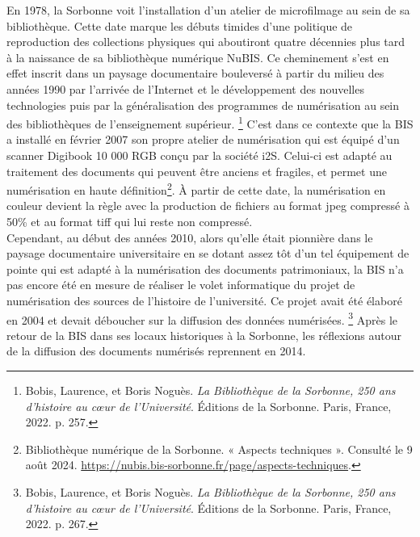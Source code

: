 \documentclass[a4paper,12pt,twoside]{book}
\begin{document}
En 1978, la Sorbonne voit l'installation d'un atelier de microfilmage au sein de sa bibliothèque. Cette date marque les débuts timides d'une politique de reproduction des collections physiques qui aboutiront quatre décennies plus tard à la naissance de sa bibliothèque numérique NuBIS. Ce cheminement s'est en effet inscrit dans un paysage documentaire bouleversé à partir du milieu des années 1990 par l'arrivée de l'Internet et le développement des nouvelles technologies puis par la généralisation des programmes de numérisation au sein des bibliothèques de l'enseignement supérieur. \footnote{Bobis, Laurence, et Boris Noguès. \emph{La Bibliothèque de la Sorbonne, 250 ans d’histoire au cœur de l’Université}. Éditions de la Sorbonne. Paris, France, 2022. p. 257.} C'est dans ce contexte que la BIS a installé en février 2007 son
propre atelier de numérisation qui est équipé d'un scanner Digibook 10 000 RGB conçu par la société i2S. Celui-ci est adapté au traitement des
documents qui peuvent être anciens et fragiles, et permet une numérisation en haute définition\footnote{Bibliothèque
	numérique de la Sorbonne. « Aspects techniques ». Consulté le 9 août
	2024.
	\url{https://nubis.bis-sorbonne.fr/page/aspects-techniques}.}. À partir de cette date, la numérisation en couleur devient la règle avec la production de fichiers au format jpeg compressé à 50\% et au format tiff qui lui reste non compressé. \\

Cependant, au début des années 2010, alors qu'elle était pionnière dans le paysage documentaire universitaire en se dotant assez tôt d'un tel équipement de pointe qui est adapté à la numérisation des documents patrimoniaux, la BIS n'a pas encore été en mesure de réaliser le volet informatique du projet de numérisation des sources de l'histoire de l'université. Ce projet avait été élaboré en 2004 et devait déboucher sur la diffusion des données numérisées. \footnote{Bobis, Laurence, et Boris Noguès. \emph{La Bibliothèque de la Sorbonne, 250 ans d’histoire au cœur de l’Université}. Éditions de la Sorbonne. Paris, France, 2022. p. 267.} Après le retour de la BIS dans ses locaux historiques à la Sorbonne, les réflexions autour de la diffusion des documents numérisés reprennent en 2014. \\
\end{document}

